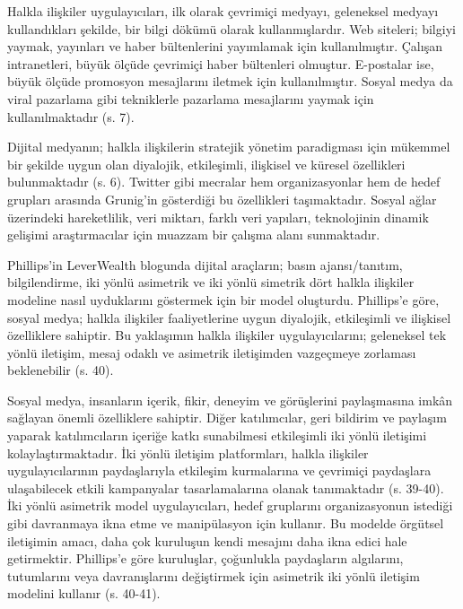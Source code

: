 \documentclass[
]{book}
\begin{document}
Halkla ilişkiler uygulayıcıları, ilk olarak çevrimiçi medyayı, geleneksel medyayı kullandıkları şekilde, bir bilgi dökümü olarak kullanmışlardır. Web siteleri; bilgiyi yaymak, yayınları ve haber bültenlerini yayımlamak için kullanılmıştır. Çalışan intranetleri, büyük ölçüde çevrimiçi haber bültenleri olmuştur. E-postalar ise, büyük ölçüde promosyon mesajlarını iletmek için kullanılmıştır. Sosyal medya da viral pazarlama gibi tekniklerle pazarlama mesajlarını yaymak için kullanılmaktadır (s. 7). \citep{grunig2009paradigms}

Dijital medyanın; halkla ilişkilerin stratejik yönetim paradigması için mükemmel bir şekilde uygun olan diyalojik, etkileşimli, ilişkisel ve küresel özellikleri bulunmaktadır (s. 6). \citep{grunig2009paradigms} Twitter gibi mecralar hem organizasyonlar hem de hedef grupları arasında Grunig'in gösterdiği bu özellikleri taşımaktadır. Sosyal ağlar üzerindeki hareketlilik, veri miktarı, farklı veri yapıları, teknolojinin dinamik gelişimi araştırmacılar için muazzam bir çalışma alanı sunmaktadır.

Phillips'in LeverWealth blogunda dijital araçların; basın ajansı/tanıtım, bilgilendirme, iki yönlü asimetrik ve iki yönlü simetrik dört halkla ilişkiler modeline nasıl uyduklarını göstermek için bir model oluşturdu. \citep{phillipsleverwealth} Phillips'e göre, sosyal medya; halkla ilişkiler faaliyetlerine uygun diyalojik, etkileşimli ve ilişkisel özelliklere sahiptir. Bu yaklaşımın halkla ilişkiler uygulayıcılarını; geleneksel tek yönlü iletişim, mesaj odaklı ve asimetrik iletişimden vazgeçmeye zorlaması beklenebilir (s. 40). \citep{mavimbela2018perceived}

Sosyal medya, insanların içerik, fikir, deneyim ve görüşlerini paylaşmasına imkân sağlayan önemli özelliklere sahiptir. Diğer katılımcılar, geri bildirim ve paylaşım yaparak katılımcıların içeriğe katkı sunabilmesi etkileşimli iki yönlü iletişimi kolaylaştırmaktadır. İki yönlü iletişim platformları, halkla ilişkiler uygulayıcılarının paydaşlarıyla etkileşim kurmalarına ve çevrimiçi paydaşlara ulaşabilecek etkili kampanyalar tasarlamalarına olanak tanımaktadır (s. 39-40). \citep{mavimbela2018perceived} İki yönlü asimetrik model uygulayıcıları, hedef gruplarını organizasyonun istediği gibi davranmaya ikna etme ve manipülasyon için kullanır. Bu modelde örgütsel iletişimin amacı, daha çok kuruluşun kendi mesajını daha ikna edici hale getirmektir. Phillips'e göre kuruluşlar, çoğunlukla paydaşların algılarını, tutumlarını veya davranışlarını değiştirmek için asimetrik iki yönlü iletişim modelini kullanır (s. 40-41). \citep{mavimbela2018perceived}
\end{document}
